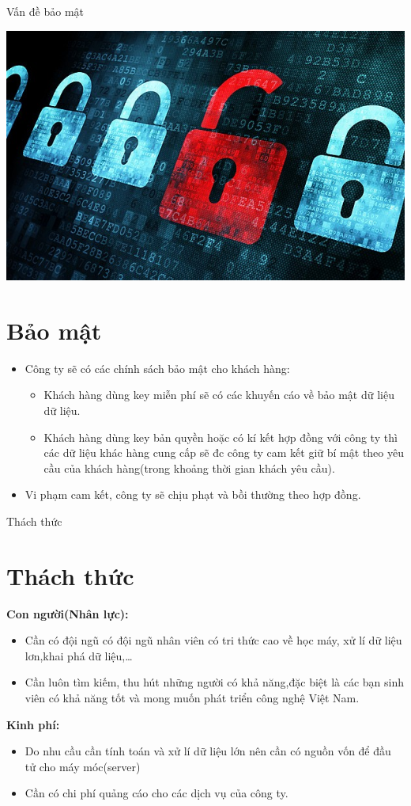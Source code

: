 \documentclass{beamer}
\begin{document}
\begin{frame}{Vấn đề bảo mật}
\begin{center}
\includegraphics[scale=0.2]{9.jpg}
\end{center}
\section{Bảo mật}
\begin{itemize}
\item Công ty sẽ có các chính sách bảo mật cho khách hàng:
\begin{itemize}
\item Khách hàng dùng key miễn phí sẽ có các khuyến cáo về bảo mật dữ liệu dữ liệu.
\item Khách hàng dùng key bản quyền hoặc có kí kết hợp đồng với công ty thì các dữ liệu khác hàng cung cấp sẽ đc công ty cam kết giữ bí mật theo yêu cầu của khách hàng(trong khoảng thời gian khách yêu cầu).
\end{itemize}
\item Vi phạm cam kết, công ty sẽ chịu phạt và bồi thường theo hợp đồng.
\end{itemize}
\end{frame}
\begin{frame}{Thách thức}
\section{Thách thức}
\textbf{Con người(Nhân lực):}
\begin{itemize}
\item Cần có đội ngũ có đội ngũ nhân viên có tri thức cao về học máy, xử lí dữ liệu lơn,khai phá dữ liệu,\ldots
\item Cần luôn tìm kiếm, thu hút những người có khả năng,đặc biệt là các bạn sinh viên có khả năng tốt và mong muốn phát triển công nghệ Việt Nam.
\end{itemize}
\textbf{Kinh phí:}
\begin{itemize}
\item Do nhu cầu cần tính toán và xử lí dữ liệu lớn nên cần có nguồn vốn để đầu tử cho máy móc(server)
\item Cần có chi phí quảng cáo cho các dịch vụ của công ty. 
\end{itemize}
\end{frame}
\end{document}
